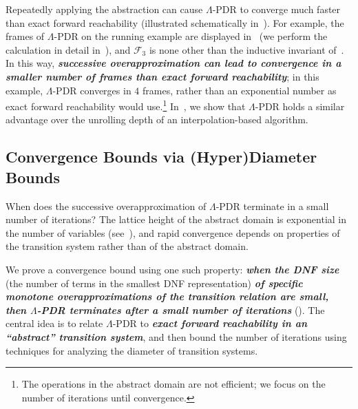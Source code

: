 \documentclass[acmsmall,screen]{acmart}
\newcommand{\Frame}{\mathcal{F}}
\begin{document}
Repeatedly applying the abstraction can cause $\Lambda$-PDR to converge much faster than exact forward reachability (illustrated schematically in~).
For example, the frames of $\Lambda$-PDR on the running example are displayed in~ (we perform the calculation in detail in~), and
%
%
%
%
%
%
%
%
%
%
%
%
$\Frame_3$ is none other than the inductive invariant of~.
%
%
%
In this way, \textbf{\textit{successive overapproximation can lead to convergence in a smaller number of frames than exact forward reachability}}; in this example, $\Lambda$-PDR converges in $4$ frames, rather than an exponential number as exact forward reachability would use.\footnote{
	The operations in the abstract domain are not efficient; we focus on the number of iterations until convergence.
}
In~, we show that $\Lambda$-PDR holds a similar advantage over the unrolling depth of an interpolation-based algorithm.

%
\subsection{Convergence Bounds via (Hyper)Diameter Bounds}
\label{sec:overview-diameter-bound}
When does the successive overapproximation of $\Lambda$-PDR terminate in a small number of iterations? The lattice height of the abstract domain is exponential in the number of variables (see~), and rapid convergence depends on properties of the transition system rather than of the abstract domain.


We prove a convergence bound using one such property: \textit{\textbf{when the DNF size}} (the number of terms in the smallest DNF representation) \textit{\textbf{of specific monotone overapproximations of the transition relation are small, then $\Lambda$-PDR terminates after a small number of iterations}} ().
The central idea is to relate $\Lambda$-PDR to \textit{\textbf{exact forward reachability in an ``abstract'' transition system}}, and then bound the number of iterations using techniques for analyzing the diameter of transition systems.
\end{document}
